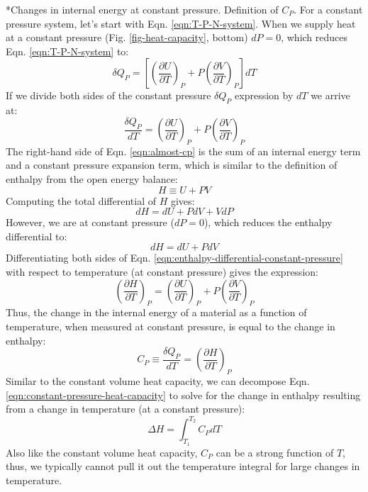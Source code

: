 \documentclass[11pt]{article}
\makeatletter
\theoremstyle{definition}
\renewcommand\subsubsection{\@startsection
	{subsubsection}{2}{0mm}
	{-0.05in}
	{-0.5\baselineskip}
	{\normalfont\normalsize\itshape}}
\makeatother
\begin{document}
\subsubsection*{Changes in internal energy at constant pressure. Definition of $C_{P}$.}
For a constant pressure system, let's start with Eqn. \eqref{eqn:T-P-N-system}. When we supply heat at a constant pressure (Fig. \ref{fig-heat-capacity}, bottom) $dP = 0$,
which reduces Eqn. \eqref{eqn:T-P-N-system} to:
\begin{equation}
	\delta{Q}_{P} = \left[\left(\frac{\partial{U}}{\partial{T}}\right)_{P}+P\left(\frac{\partial{V}}{\partial{T}}\right)_{P}\right]dT
\end{equation}If we divide both sides of the constant pressure $\delta{Q}_{P}$ expression by $dT$ we arrive at:
\begin{equation}\label{eqn:almost-cp}
	\frac{\delta{Q}_{P}}{dT} = \left(\frac{\partial{U}}{\partial{T}}\right)_{P}+P\left(\frac{\partial{V}}{\partial{T}}\right)_{P}
\end{equation}The right-hand side of Eqn. \eqref{eqn:almost-cp} is the sum of an internal energy term and a constant pressure expansion term, which is similar to the definition of
enthalpy from the open energy balance:
\begin{equation}\label{eqn:enthalpy}
	H \equiv U + PV
\end{equation}Computing the total differential of $H$ gives:
\begin{equation}
	dH = dU + PdV + VdP
\end{equation}However, we are at constant pressure ($dP = 0$), which reduces the enthalpy differential to:
\begin{equation}\label{eqn:enthalpy-differential-constant-pressure}
	dH = dU + PdV
\end{equation}Differentiating both sides of Eqn. \eqref{eqn:enthalpy-differential-constant-pressure} with respect to temperature (at constant pressure) gives the expression:
\begin{equation}
	\left(\frac{\partial{H}}{\partial{T}}\right)_{P} = \left(\frac{\partial{U}}{\partial{T}}\right)_{P} + P\left(\frac{\partial{V}}{\partial{T}}\right)_{P}
\end{equation}Thus, the change in the internal energy of a material as a function of temperature, when measured at constant pressure, is equal to the change in enthalpy:
\begin{equation}\label{eqn:constant-pressure-heat-capacity}
	C_{P}\equiv\frac{\delta{Q}_{P}}{dT} = \left(\frac{\partial{H}}{\partial{T}}\right)_{P}
\end{equation}Similar to the constant volume heat capacity, we can decompose Eqn. \eqref{eqn:constant-pressure-heat-capacity} to solve for the change in enthalpy resulting
from a change in temperature (at a constant pressure):
\begin{equation}
	\Delta{H} = \int_{T_{1}}^{T_{2}}C_{P}dT
\end{equation}Also like the constant volume heat capacity, $C_{P}$ can be a strong function of $T$, thus, we typically cannot pull it out the temperature integral for large changes
in temperature.
\end{document}
